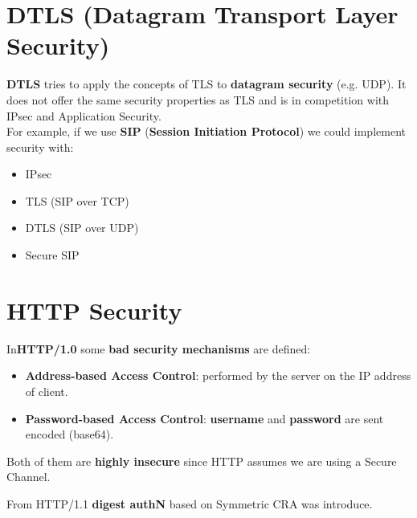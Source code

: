 \section{DTLS (Datagram Transport Layer Security)}
\textbf{DTLS} tries to apply the concepts of TLS to \textbf{datagram security} (e.g. UDP). It does not
offer the same security properties as TLS and is in competition with IPsec and Application Security.\\
For example, if we use \textbf{SIP} (\textbf{Session Initiation Protocol}) we could implement security with:
\begin{itemize}
    \item IPsec
    \item TLS (SIP over TCP)
    \item DTLS (SIP over UDP)
    \item Secure SIP
\end{itemize}

\section{HTTP Security}
In\textbf{HTTP/1.0} some \textbf{bad security mechanisms} are defined:
\begin{itemize}
    \item \textbf{Address-based Access Control}: performed by the server on the IP address of client. 
    \item \textbf{Password-based Access Control}: \textbf{username} and \textbf{password} are sent encoded (base64).
\end{itemize}
Both of them are \textbf{highly insecure} since HTTP assumes we are using a Secure Channel. 
\begin{quotebox-yellow}{}
From HTTP/1.1 \textbf{digest authN} based on Symmetric CRA was introduce.
\end{quotebox-yellow}

